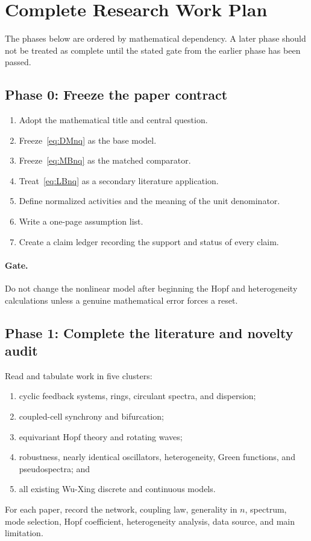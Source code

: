 \documentclass[11pt, reqno]{amsart}
\theoremstyle{definition}
\theoremstyle{remark}
\begin{document}
	\section{Complete Research Work Plan}
	\label{app:work-plan}
	
	The phases below are ordered by mathematical dependency.  A later phase should
	not be treated as complete until the stated gate from the earlier phase has
	been passed.
	
	\subsection{Phase 0: Freeze the paper contract}
	
	\begin{enumerate}[label=0.\arabic*,leftmargin=3em]
		\item Adopt the mathematical title and central question.
		\item Freeze~\eqref{eq:DMnq} as the base model.
		\item Freeze~\eqref{eq:MBnq} as the matched comparator.
		\item Treat~\eqref{eq:LBnq} as a secondary literature application.
		\item Define normalized activities and the meaning of the unit denominator.
		\item Write a one-page assumption list.
		\item Create a claim ledger recording the support and status of every claim.
	\end{enumerate}
	
	\paragraph{Gate.}
	Do not change the nonlinear model after beginning the Hopf and heterogeneity
	calculations unless a genuine mathematical error forces a reset.
	
	\subsection{Phase 1: Complete the literature and novelty audit}
	
	Read and tabulate work in five clusters:
	\begin{enumerate}[label=1.\arabic*,leftmargin=3em]
		\item cyclic feedback systems, rings, circulant spectra, and dispersion;
		\item coupled-cell synchrony and bifurcation;
		\item equivariant Hopf theory and rotating waves;
		\item robustness, nearly identical oscillators, heterogeneity, Green
		functions, and pseudospectra; and
		\item all existing Wu-Xing discrete and continuous models.
	\end{enumerate}
	For each paper, record the network, coupling law, generality in $n$, spectrum,
	mode selection, Hopf coefficient, heterogeneity analysis, data source, and main
	limitation.
	
\end{document}

